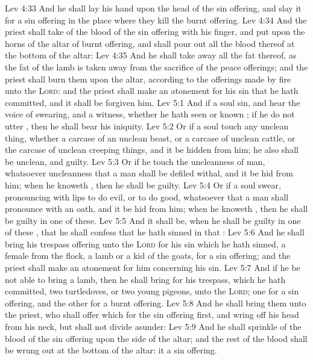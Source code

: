 \vs Lev 4:33 And he shall lay his hand upon the head of the sin offering, and slay it for a sin offering in the place where they kill the burnt offering.
\vs Lev 4:34 And the priest shall take of the blood of the sin offering with his finger, and put  upon the horns of the altar of burnt offering, and shall pour out all the blood thereof at the bottom of the altar:
\vs Lev 4:35 And he shall take away all the fat thereof, as the fat of the lamb is taken away from the sacrifice of the peace offerings; and the priest shall burn them upon the altar, according to the offerings made by fire unto the \textsc{Lord}: and the priest shall make an atonement for his sin that he hath committed, and it shall be forgiven him.
\vs Lev 5:1 And if a soul sin, and hear the voice of swearing, and  a witness, whether he hath seen or known ; if he do not utter , then he shall bear his iniquity.
\vs Lev 5:2 Or if a soul touch any unclean thing, whether  a carcase of an unclean beast, or a carcase of unclean cattle, or the carcase of unclean creeping things, and  it be hidden from him; he also shall be unclean, and guilty.
\vs Lev 5:3 Or if he touch the uncleanness of man, whatsoever uncleanness  that a man shall be defiled withal, and it be hid from him; when he knoweth , then he shall be guilty.
\vs Lev 5:4 Or if a soul swear, pronouncing with  lips to do evil, or to do good, whatsoever  that a man shall pronounce with an oath, and it be hid from him; when he knoweth , then he shall be guilty in one of these.
\vs Lev 5:5 And it shall be, when he shall be guilty in one of these , that he shall confess that he hath sinned in that :
\vs Lev 5:6 And he shall bring his trespass offering unto the \textsc{Lord} for his sin which he hath sinned, a female from the flock, a lamb or a kid of the goats, for a sin offering; and the priest shall make an atonement for him concerning his sin.
\vs Lev 5:7 And if he be not able to bring a lamb, then he shall bring for his trespass, which he hath committed, two turtledoves, or two young pigeons, unto the \textsc{Lord}; one for a sin offering, and the other for a burnt offering.
\vs Lev 5:8 And he shall bring them unto the priest, who shall offer  which  for the sin offering first, and wring off his head from his neck, but shall not divide  asunder:
\vs Lev 5:9 And he shall sprinkle of the blood of the sin offering upon the side of the altar; and the rest of the blood shall be wrung out at the bottom of the altar: it  a sin offering.
